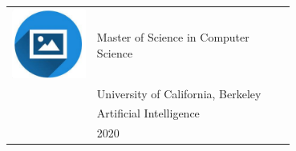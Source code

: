 \documentclass{article}
\begin{document}
\begin{paracol}{2}
 \begin{tabular}{@{}cp{0.7\linewidth}}
      \begin{minipage}{0.05\linewidth}
        \includegraphics[width=\linewidth]{picon.png}
      \end{minipage} & \vspace{-12pt}
      {\color{sidetext} {{Master of Science in Computer Science}}} \\[-6pt]
      & {{University of California, Berkeley}} \\
      & {{Artificial Intelligence}} \\
      & {{2020}} 
    \end{tabular}


~

~


\end{paracol}
\end{document}
